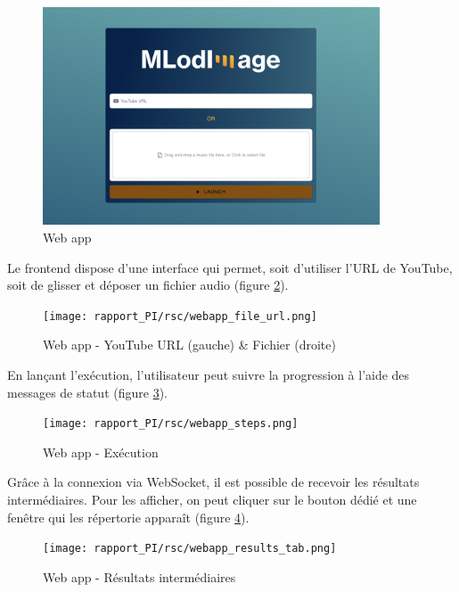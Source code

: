 \begin{figure}[H]
    \begin{center}
        \includegraphics[width=10cm,]{rsc/webapp.png}
        \caption{Web app}
        \label{fig:webapp}
    \end{center}
\end{figure}

Le frontend dispose d'une interface qui permet, soit d'utiliser l'URL de YouTube, soit de glisser et déposer un fichier audio (figure \ref{fig:webapp_file_url}).

\begin{figure}[H]
    \begin{center}
        \texttt{[image: rapport\_PI/rsc/webapp\_file\_url.png]}
        \caption{Web app - YouTube URL (gauche) \& Fichier (droite)}
        \label{fig:webapp_file_url}
    \end{center}
\end{figure}

En lançant l'exécution, l'utilisateur peut suivre la progression à l'aide des messages de statut (figure \ref{fig:webapp_steps}).

\begin{figure}[H]
    \begin{center}
        \texttt{[image: rapport\_PI/rsc/webapp\_steps.png]}
        \caption{Web app - Exécution}
        \label{fig:webapp_steps}
    \end{center}
\end{figure}

Grâce à la connexion via WebSocket, il est possible de recevoir les résultats intermédiaires. Pour les afficher, on peut cliquer sur le bouton dédié et une fenêtre qui les répertorie apparaît (figure \ref{fig:webapp_results_tab}).

\begin{figure}[H]
    \begin{center}
        \texttt{[image: rapport\_PI/rsc/webapp\_results\_tab.png]}
        \caption{Web app - Résultats intermédiaires}
        \label{fig:webapp_results_tab}
    \end{center}
\end{figure}

